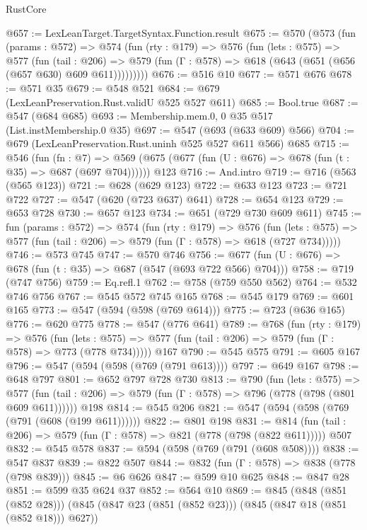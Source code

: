\begin{lexlean}{RustCore}
\begin{coremodule}
@657 := LexLeanTarget.TargetSyntax.Function.result
@675 := @570
    (@573
      (fun (params : @572) =>
      @574
        (fun (rty : @179) =>
        @576
          (fun (lets : @575) =>
          @577
            (fun (tail : @206) =>
            @579 (fun (Γ : @578) => @618 (@643 (@651 (@656 (@657 @630) @609 @611)))))))))
@676 := @516 @10
@677 := @571 @676
@678 := @571 @35
@679 := @548 @521
@684 := @679 (LexLeanPreservation.Rust.validU @525 @527 @611)
@685 := Bool.true
@687 := @547 (@684 @685)
@693 := Membership.mem.{0, 0} @35 @517 (List.instMembership.{0} @35)
@697 := @547 (@693 (@633 @609) @566)
@704 := @679 (LexLeanPreservation.Rust.uninh @525 @527 @611 @566) @685
@715 := @546
    (fun (fn : @7) =>
    @569 (@675 (@677 (fun (U : @676) => @678 (fun (t : @35) => @687 (@697 @704))))))
    @123
@716 := And.intro
@719 := @716 (@563 (@565 @123))
@721 := @628 (@629 @123)
@722 := @633 @123
@723 := @721 @722
@727 := @547 (@620 (@723 @637) @641)
@728 := @654 @123
@729 := @653 @728
@730 := @657 @123
@734 := @651 (@729 @730 @609 @611)
@745 := fun (params : @572) =>
  @574
    (fun (rty : @179) =>
    @576
      (fun (lets : @575) => @577 (fun (tail : @206) => @579 (fun (Γ : @578) => @618 (@727 @734)))))
@746 := @573 @745
@747 := @570 @746
@756 := @677 (fun (U : @676) => @678 (fun (t : @35) => @687 (@547 (@693 @722 @566) @704)))
@758 := @719 (@747 @756)
@759 := Eq.refl.{1}
@762 := @758 (@759 @550 @562)
@764 := @532 @746 @756
@767 := @545 @572 @745 @165
@768 := @545 @179
@769 := @601 @165
@773 := @547 (@594 (@598 (@769 @614)))
@775 := @723 (@636 @165)
@776 := @620 @775
@778 := @547 (@776 @641)
@789 := @768
    (fun (rty : @179) =>
    @576
      (fun (lets : @575) => @577 (fun (tail : @206) => @579 (fun (Γ : @578) => @773 (@778 @734)))))
    @167
@790 := @545 @575
@791 := @605 @167
@796 := @547 (@594 (@598 (@769 (@791 @613))))
@797 := @649 @167
@798 := @648 @797
@801 := @652 @797 @728 @730
@813 := @790
    (fun (lets : @575) =>
    @577 (fun (tail : @206) => @579 (fun (Γ : @578) => @796 (@778 (@798 (@801 @609 @611))))))
    @198
@814 := @545 @206
@821 := @547 (@594 (@598 (@769 (@791 (@608 (@199 @611))))))
@822 := @801 @198
@831 := @814 (fun (tail : @206) => @579 (fun (Γ : @578) => @821 (@778 (@798 (@822 @611))))) @507
@832 := @545 @578
@837 := @594 (@598 (@769 (@791 (@608 @508))))
@838 := @547 @837
@839 := @822 @507
@844 := @832 (fun (Γ : @578) => @838 (@778 (@798 @839)))
@845 := @6 @626
@847 := @599 @10 @625
@848 := @847 @28
@851 := @599 @35 @624 @37
@852 := @564 @10
@869 := @845
    (@848 (@851 (@852 @28)))
    (@845 (@847 @23 (@851 (@852 @23))) (@845 (@847 @18 (@851 (@852 @18))) @627))

\end{coremodule}
\end{lexlean}
